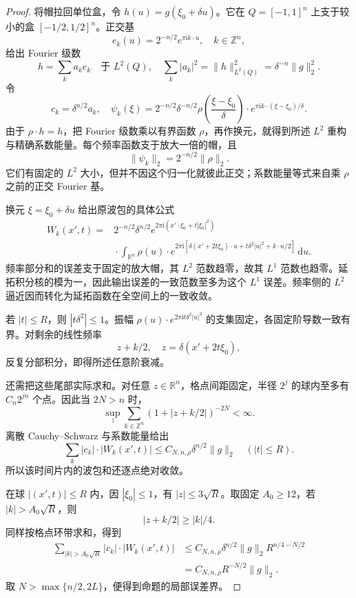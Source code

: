 \begin{proof}
将帽拉回单位盒，令 \(h(u)=g(\xi_0+\delta u)\)。它在
\(Q=[-1,1]^n\) 上支于较小的盒 \([-1/2,1/2]^n\)。正交基
\[
 e_k(u)=2^{-n/2}e^{\pi\mathrm i k\cdot u},\quad k\in\mathbb Z^n,
\]
给出 Fourier 级数
\[
 h=\sum_ka_ke_k\quad\text{于 }L^2(Q),\quad
 \sum_k|a_k|^2=\|h\|_{L^2(Q)}^2
             =\delta^{-n}\|g\|_2^2.
\]
令
\[
 c_k=\delta^{n/2}a_k,\quad
 \psi_k(\xi)=2^{-n/2}\delta^{-n/2}
       \rho\!\left(\frac{\xi-\xi_0}{\delta}\right)
       \cdot e^{\pi\mathrm i k\cdot(\xi-\xi_0)/\delta}.
\]
由于 \(\rho\cdot h=h\)，把 Fourier 级数乘以有界函数 \(\rho\)，再作换元，就得到所述 \(L^2\) 重构与精确系数能量。每个频率函数支于放大一倍的帽，且
\[
 \|\psi_k\|_2=2^{-n/2}\|\rho\|_2.
\]
它们有固定的 \(L^2\) 大小，但并不因这个归一化就彼此正交；系数能量等式来自乘 \(\rho\) 之前的正交 Fourier 基。

换元 \(\xi=\xi_0+\delta u\) 给出原波包的具体公式
\[
 \begin{aligned}
 W_k(x',t)
 ={}&2^{-n/2}\delta^{n/2}
       e^{2\pi\mathrm i(x'\cdot\xi_0+t|\xi_0|^2)}\\
 &{}\cdot
 \int_{\mathbb R^n}\rho(u)\cdot
       e^{2\pi\mathrm i[
          \delta(x'+2t\xi_0)\cdot u
          +t\delta^2|u|^2+k\cdot u/2]}\,\mathrm du.
 \end{aligned}
\]
频率部分和的误差支于固定的放大帽，其 \(L^2\) 范数趋零，故其 \(L^1\) 范数也趋零。延拓积分核的模为一，因此输出误差的一致范数至多为这个 \(L^1\) 误差。频率侧的 \(L^2\) 逼近因而转化为延拓函数在全空间上的一致收敛。

若 \(|t|\leq R\)，则 \(|t\delta^2|\leq1\)。振幅
\(\rho(u)\cdot e^{2\pi\mathrm i t\delta^2|u|^2}\)
的支集固定，各固定阶导数一致有界。对剩余的线性频率
\[
 z+k/2,\quad z=\delta(x'+2t\xi_0),
\]
反复分部积分，即得所述任意阶衰减。

还需把这些尾部实际求和。对任意 \(z\in\mathbb R^n\)，格点间距固定，半径 \(2^j\) 的球内至多有 \(C_n2^{jn}\) 个点。因此当 \(2N>n\) 时，
\[
 \sup_z\sum_{k\in\mathbb Z^n}
       (1+|z+k/2|)^{-2N}<\infty.
\]
离散 Cauchy--Schwarz 与系数能量给出
\[
 \sum_k|c_k|\cdot|W_k(x',t)|
 \leq C_{N,n,\rho}\delta^{n/2}\|g\|_2
 \quad(|t|\leq R).
\]
所以该时间片内的波包和还逐点绝对收敛。

在球 \(|(x',t)|\leq R\) 内，因 \(|\xi_0|\leq1\)，有
\(|z|\leq3\sqrt R\)。取固定 \(A_0\geq12\)，若 \(|k|>A_0\sqrt R\)，则
\[
 |z+k/2|\geq|k|/4.
\]
同样按格点环带求和，得到
\[
 \begin{aligned}
 \sum_{|k|>A_0\sqrt R}|c_k|\cdot|W_k(x',t)|
 &\leq C_{N,n,\rho}\delta^{n/2}\|g\|_2
        R^{n/4-N/2}\\
 &=C_{N,n,\rho}R^{-N/2}\|g\|_2.
 \end{aligned}
\]
取 \(N>\max\{n/2,2L\}\)，便得到命题的局部误差界。
\end{proof}

